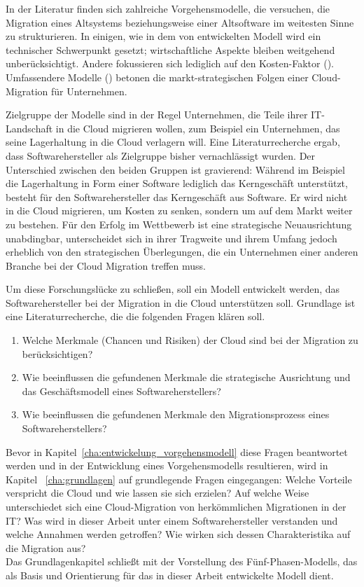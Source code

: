 In der Literatur finden sich zahlreiche Vorgehensmodelle, die 
versuchen, die Migration eines Altsystems beziehungsweise einer Altsoftware im 
weitesten Sinne zu strukturieren. In einigen, wie in dem von 
 entwickelten Modell wird 
ein technischer Schwerpunkt gesetzt; wirtschaftliche Aspekte bleiben weitgehend 
unberücksichtigt. Andere fokussieren sich lediglich auf den Kosten-Faktor 
(). Umfassendere Modelle 
() betonen die 
markt-strategischen Folgen einer Cloud-Migration für Unternehmen. 

Zielgruppe der Modelle sind in der Regel Unternehmen, die Teile ihrer 
IT-Landschaft in die Cloud migrieren wollen, zum Beispiel ein Unternehmen, das 
seine Lagerhaltung in die Cloud verlagern will. Eine Literaturrecherche ergab, 
dass Softwarehersteller als Zielgruppe bisher vernachlässigt wurden. Der 
Unterschied zwischen den beiden Gruppen ist gravierend: Während im Beispiel die 
Lagerhaltung in Form einer Software lediglich das Kerngeschäft unterstützt, 
besteht für den Softwarehersteller das Kerngeschäft aus Software. Er wird nicht 
in die Cloud migrieren, um Kosten zu senken, sondern um auf dem Markt weiter zu 
bestehen. Für den Erfolg im Wettbewerb ist eine strategische Neuausrichtung 
unabdingbar, unterscheidet sich in ihrer Tragweite und ihrem Umfang jedoch 
erheblich von den strategischen Überlegungen, die ein Unternehmen einer anderen 
Branche bei der Cloud Migration treffen muss. 

Um diese Forschungslücke zu schließen, soll ein Modell entwickelt werden, das 
Softwarehersteller bei der Migration in die Cloud unterstützen soll. Grundlage 
ist eine Literaturrecherche, die die folgenden Fragen klären soll.
\begin{enumerate}
	\item Welche Merkmale (Chancen und Risiken) der Cloud sind bei der 
Migration zu berücksichtigen?
	\item Wie beeinflussen die gefundenen Merkmale die strategische 
Ausrichtung und das Geschäftsmodell eines Softwareherstellers?
	\item Wie beeinflussen die gefundenen Merkmale den Migrationsprozess 
eines Softwareherstellers?
\end{enumerate}

Bevor in Kapitel~\ref{cha:entwickelung_vorgehensmodell} diese Fragen 
beantwortet werden und in der Entwicklung eines Vorgehensmodells resultieren, 
wird in Kapitel ~\ref{cha:grundlagen} auf grundlegende Fragen eingegangen: 
Welche Vorteile verspricht die Cloud und wie lassen sie sich erzielen? Auf 
welche Weise unterschiedet sich eine Cloud-Migration von herkömmlichen 
Migrationen in der IT? Was wird in dieser Arbeit unter einem Softwarehersteller 
verstanden und welche Annahmen werden getroffen? Wie wirken sich dessen 
Charakteristika auf die Migration aus? \\ Das Grundlagenkapitel schließt mit 
der Vorstellung des Fünf-Phasen-Modells, das als Basis und Orientierung für das 
in dieser Arbeit entwickelte Modell dient.

